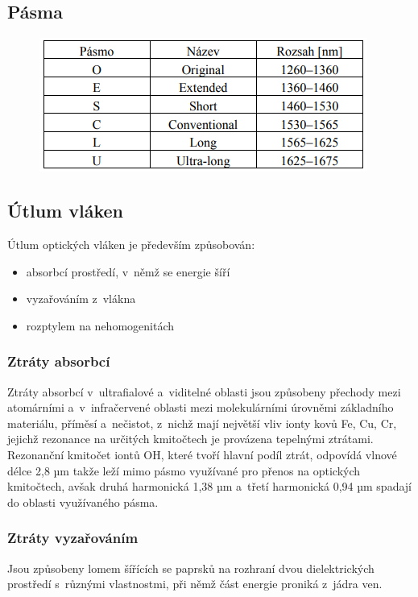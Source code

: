 \subsection{Pásma}
\begin{figure}[!ht]
  \begin{center}
    \includegraphics[scale=1]{obrazky/pasma.png}
  \end{center}
\end{figure}

\subsection{Útlum vláken}
Útlum optických vláken je především způsobován:
\begin{itemize}
  \item absorbcí prostředí, v~němž se energie šíří
  \item vyzařováním z~vlákna
  \item rozptylem na nehomogenitách
\end{itemize}

\subsubsection{Ztráty absorbcí}
Ztráty absorbcí v~ultrafialové a~viditelné oblasti jsou způsobeny přechody mezi atomárními a~v~infračervené oblasti mezi molekulárními úrovněmi základního materiálu, příměsí a~nečistot, z~nichž mají největší vliv ionty kovů Fe, Cu, Cr, jejichž rezonance na určitých kmitočtech je provázena tepelnými ztrátami. Rezonanční kmitočet iontů OH, které tvoří hlavní podíl ztrát, odpovídá vlnové délce 2,8 µm takže leží mimo pásmo využívané pro přenos na optických kmitočtech, avšak druhá harmonická 1,38 µm a~třetí harmonická 0,94 µm spadají do oblasti využívaného pásma.

\subsubsection{Ztráty vyzařováním}
Jsou způsobeny lomem šířících se paprsků na rozhraní dvou dielektrických prostředí s~různými vlastnostmi, při němž část energie proniká z~jádra ven.

